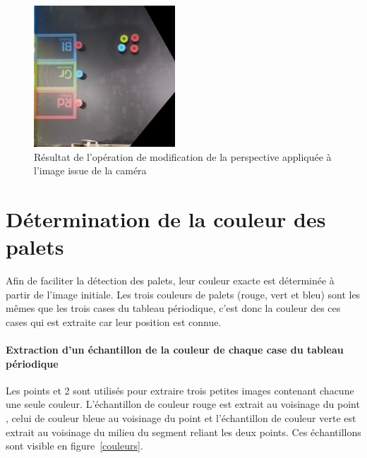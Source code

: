 \documentclass{article}
\begin{document}
\begin{figure}[!h]
\begin{center}
\includegraphics[height=150pt]{apres_modif_perspective.jpg}
\end{center}
\caption{Résultat de l'opération de modification de la perspective appliquée à l'image issue de la caméra}
\label{perspective_corrigee}
\end{figure}

\section{Détermination de la couleur des palets}
Afin de faciliter la détection des palets, leur couleur exacte est déterminée à partir de l'image initiale.
Les trois couleurs de palets (rouge, vert et bleu) sont les mêmes que les trois cases du tableau périodique, c'est donc la couleur des ces cases
qui est extraite car leur position est connue.

\paragraph{Extraction d'un échantillon de la couleur de chaque case du tableau périodique}
Les points  et 2 sont utilisés pour extraire trois petites images contenant chacune une seule couleur.
L'échantillon de couleur rouge est extrait au voisinage du point , celui de couleur bleue au voisinage du point 
et l'échantillon de couleur verte est extrait au voisinage du milieu du segment reliant les deux points.
Ces échantillons sont visible en figure~\ref{couleurs}.
\end{document}
